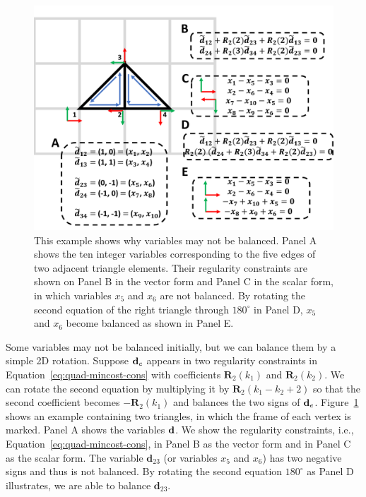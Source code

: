 \begin{figure}
\centering
\includegraphics[width=0.6\linewidth]{quadriflow/diagram/balance.pdf}
\caption{This example shows why variables may not be balanced. Panel A shows the ten integer variables corresponding to the five edges of two adjacent triangle elements. Their regularity constraints are shown on Panel B in the vector form and Panel C in the scalar form, in which variables $x_5$ and $x_6$ are not balanced.  By rotating the second equation of the right triangle through $180^\circ$ in Panel D, $x_5$ and $x_6$ become balanced as shown in Panel E.}
\label{fig:quad-balance}
\end{figure}

Some variables may not be balanced initially, but we can balance them by a simple 2D rotation. Suppose ${\mathbf{d}}_e$ appears in two regularity constraints in Equation~\eqref{eq:quad-mincost-cons} with coefficients $\mathbf{R}_2(k_1)$ and $\mathbf{R}_2(k_2)$. We can rotate the second equation by multiplying it by $\mathbf{R}_2(k_1-k_2+2)$ so that the second coefficient becomes $-\mathbf{R}_2(k_1)$ and balances the two signs of ${\mathbf{d}}_e$. Figure~\ref{fig:quad-balance} shows an example containing two triangles, in which the frame of each vertex is marked. Panel A shows the variables ${{\mathbf{d}}}$. We show the regularity constraints, i.e., Equation~\eqref{eq:quad-mincost-cons}, in Panel B as the vector form and in Panel C as the scalar form. The variable ${\textbf{d}}_{23}$ (or variables $x_5$ and $x_6$) has two negative signs and thus is not balanced. By rotating the second equation $180^\circ$ as Panel D illustrates, we are able to balance ${\textbf{d}}_{23}$.


